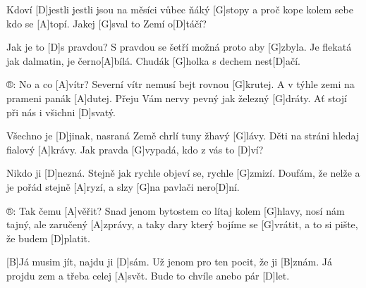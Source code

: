 
Kdoví [D]jestli 
jestli jsou na měsíci vůbec ňáký [G]stopy 
a proč kope kolem sebe kdo se [A]topí. 
Jakej [G]sval to Zemí o[D]táčí? 

Jak je to [D]s pravdou? 
S pravdou se šetří možná proto aby [G]zbyla. 
Je flekatá jak dalmatin, je černo[A]bílá. 
Chudák [G]holka s dechem nest[D]ačí. 

®: No a co [A]vítr? 
Severní vítr nemusí bejt rovnou [G]krutej. 
A v týhle zemi na prameni panák [A]dutej. 
Přeju Vám nervy pevný jak železný [G]dráty. 
Ať stojí při nás i všichni [D]svatý. 

Všechno je [D]jinak, 
nasraná Země chrlí tuny žhavý [G]lávy. 
Děti na stráni hledaj fialový [A]krávy. 
Jak pravda [G]vypadá, kdo z vás to [D]ví? 

Nikdo ji [D]nezná. 
Stejně jak rychle objeví se, rychle [G]zmizí. 
Doufám, že nelže a je pořád stejně [A]ryzí, 
a slzy [G]na pavlači nero[D]ní. 

®: Tak čemu [A]věřit? 
Snad jenom bytostem co lítaj kolem [G]hlavy, 
nosí nám tajný, ale zaručený [A]zprávy, 
a taky dary který bojíme se [G]vrátit, 
a to si pište, že budem [D]platit. 


[B]Já musim jít, najdu ji [D]sám. 
Už jenom pro ten pocit, že ji [B]znám. 
Já projdu zem a třeba celej [A]svět. 
Bude to chvíle anebo pár [D]let. 

